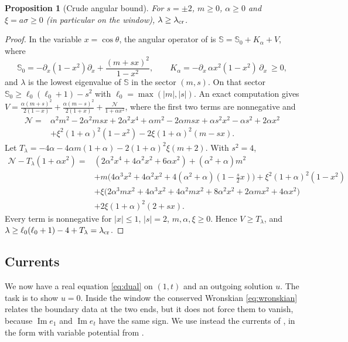 \documentclass[11pt]{amsart}
\newtheorem{proposition}[theorem]{Proposition}
\theoremstyle{definition}
\theoremstyle{remark}
\numberwithin{equation}{section}
\renewcommand{\Im}{\operatorname{Im}}
\begin{document}
\begin{proposition}[Crude angular bound]\label{prop:angular}
For $s=\pm2$, $m\ge0$, $\alpha\ge0$ and $\xi=a\sigma\ge0$ (in particular on the window), $\lambda\ge\lambda_{\rm cr}$.
\end{proposition}
\begin{proof}
In the variable $x=\cos\theta$, the angular operator of \cite[(2.3)]{STU98} is $\mathbb S=\mathbb S_0+K_\alpha+V$, where
\[
\mathbb S_0=-\partial_x(1-x^2)\partial_x+\frac{(m+sx)^2}{1-x^2},\qquad K_\alpha=-\partial_x\,\alpha x^2(1-x^2)\,\partial_x\ \ge0,
\]
and $\lambda$ is the lowest eigenvalue of $\mathbb S$ in the sector $(m,s)$. On that sector $\mathbb S_0\ge\ell_0(\ell_0+1)-s^2$ with
$\ell_0=\max(|m|,|s|)$. An exact computation gives
$V=\frac{\alpha(m+s)^2}{2(1-x)}+\frac{\alpha(m-s)^2}{2(1+x)}+\frac{\mathcal N}{1+\alpha x^2}$, where the first two terms are
nonnegative and
\begin{align*}
\mathcal N={}&\alpha^2m^2-2\alpha^2msx+2\alpha^2x^4+\alpha m^2-2\alpha msx+\alpha s^2x^2-\alpha s^2+2\alpha x^2\\
&+\xi^2(1+\alpha)^2(1-x^2)-2\xi(1+\alpha)^2(m-sx).
\end{align*}
Let $T_\lambda=-4\alpha-4\alpha m(1+\alpha)-2(1+\alpha)^2\xi(m+2)$. With $s^2=4$,
\begin{align*}
\mathcal N-T_\lambda(1+\alpha x^2)={}&(2\alpha^2x^4+4\alpha^2x^2+6\alpha x^2)+(\alpha^2+\alpha)m^2\\
&+m\big(4\alpha^3x^2+4\alpha^2x^2+4(\alpha^2+\alpha)(1-\tfrac{s}{2}x)\big)+\xi^2(1+\alpha)^2(1-x^2)\\
&+\xi\big(2\alpha^3mx^2+4\alpha^3x^2+4\alpha^2mx^2+8\alpha^2x^2+2\alpha mx^2+4\alpha x^2\big)\\
&+2\xi(1+\alpha)^2(2+sx).
\end{align*}
Every term is nonnegative for $|x|\le1$, $|s|=2$, $m,\alpha,\xi\ge0$. Hence $V\ge T_\lambda$, and
$\lambda\ge\ell_0(\ell_0+1)-4+T_\lambda=\lambda_{\rm cr}$.
\end{proof}


\subsection{Currents}\label{subsec:currents}
We now have a real equation \eqref{eq:dual} on $(1,t)$ and an outgoing solution $u$. The task is to show $u=0$.
Inside the window the conserved Wronskian \eqref{eq:wronskian} relates the boundary data at the two ends, but it does
not force them to vanish, because $\Im e_1$ and $\Im e_t$ have the same sign. We use instead the currents of
\cite[Lemma~4.1]{Hin26}, in the form with variable potential from \cite[\S7]{Hin26}.
\end{document}
